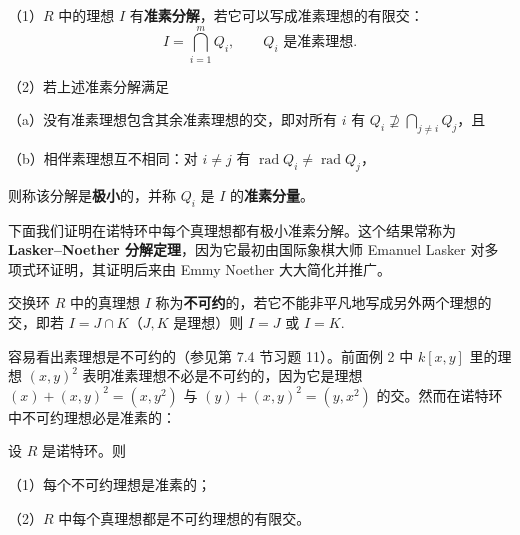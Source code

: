 \begin{definition}
（1）\(R\) 中的理想 \(I\) 有\textbf{准素分解}，若它可以写成准素理想的有限交：
\[
I = \bigcap_{i=1}^{m}Q_i, \qquad Q_i \text{ 是准素理想}.
\]

（2）若上述准素分解满足

（a）没有准素理想包含其余准素理想的交，即对所有 \(i\) 有 \(Q_i \nsupseteq \bigcap_{j \neq i}Q_j\)，且

（b）相伴素理想互不相同：对 \(i \neq j\) 有 \(\operatorname{rad}Q_i \neq \operatorname{rad}Q_j\)，

则称该分解是\textbf{极小}的，并称 \(Q_i\) 是 \(I\) 的\textbf{准素分量}。
\end{definition}

下面我们证明在诺特环中每个真理想都有极小准素分解。这个结果常称为 \textbf{Lasker--Noether 分解定理}，因为它最初由国际象棋大师 Emanuel Lasker 对多项式环证明，其证明后来由 Emmy Noether 大大简化并推广。

\begin{definition}
交换环 \(R\) 中的真理想 \(I\) 称为\textbf{不可约}的，若它不能非平凡地写成另外两个理想的交，即若 \(I = J \cap K\)（\(J, K\) 是理想）则 \(I = J\) 或 \(I = K\).
\end{definition}

容易看出素理想是不可约的（参见第 7.4 节习题 11）。前面例 2 中 \(k[x,y]\) 里的理想 \((x,y)^2\) 表明准素理想不必是不可约的，因为它是理想 \((x)+(x,y)^2 = (x,y^2)\) 与 \((y)+(x,y)^2 = (y,x^2)\) 的交。然而在诺特环中不可约理想必是准素的：

\begin{proposition}\label{pro:15.20}
设 \(R\) 是诺特环。则

（1）每个不可约理想是准素的；

（2）\(R\) 中每个真理想都是不可约理想的有限交。
\end{proposition}


